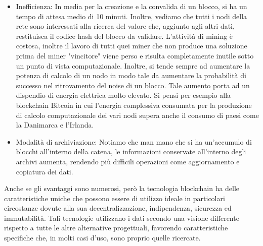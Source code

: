 \begin{itemize}
    \item Inefficienza: In media per la creazione e la convalida di un blocco, si ha un tempo di attesa medio di 10 minuti. Inoltre, vediamo che tutti i nodi della rete sono interessati alla ricerca del valore che, aggiunto agli altri dati, restituisca il codice hash del blocco da validare. L'attività di mining è costosa, inoltre il lavoro di tutti quei miner che non produce una soluzione prima del miner "vincitore" viene perso e risulta completamente inutile sotto un punto di vista computazionale. Inoltre, si tende sempre ad aumentare la potenza di calcolo di un nodo in modo tale da aumentare la probabilità di successo nel ritrovamento del noise di un blocco. Tale aumento porta ad un dispendio di energia elettrica molto elevato. Si pensi per esempio alla blockchain Bitcoin in cui l'energia complessiva consumata per la produzione di calcolo computazionale dei vari nodi supera anche il consumo di paesi come la Danimarca e l'Irlanda.
    \item Modalità di archiviazione: Notiamo che man mano che si ha un'accumulo di blocchi all'interno della catena, le informazioni conservate all'interno degli archivi aumenta, rendendo più difficili operazioni come aggiornamento e copiatura dei dati.
\end{itemize}
Anche se gli svantaggi sono numerosi, però la tecnologia blockchain ha delle caratteristiche uniche che possono essere di utilizzo ideale in particolari circostanze dovute alla sua decentralizzazione, indipendenza, sicurezza ed immutabilità. Tali tecnologie utilizzano i dati secondo una visione differente rispetto a tutte le altre alternative progettuali, favorendo caratteristiche specifiche che, in molti casi d'uso, sono proprio quelle ricercate.
\newpage
